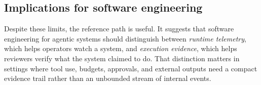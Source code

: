 \subsection{Implications for software engineering}

Despite these limits, the reference path is useful. It suggests that software engineering for agentic systems should distinguish between \emph{runtime telemetry}, which helps operators watch a system, and \emph{execution evidence}, which helps reviewers verify what the system claimed to do. That distinction matters in settings where tool use, budgets, approvals, and external outputs need a compact evidence trail rather than an unbounded stream of internal events.
